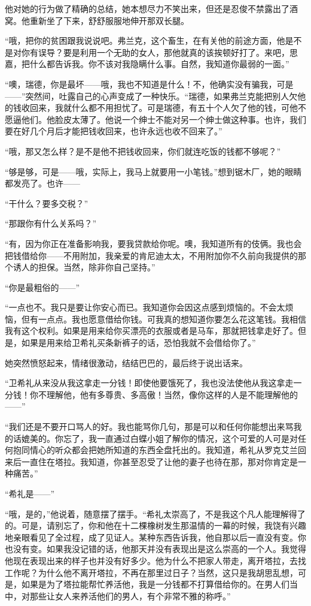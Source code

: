 \par 他对她的行为做了精确的总结，她本想尽力不笑出来，但还是忍俊不禁露出了酒窝。他重新坐了下来，舒舒服服地伸开那双长腿。
\par “哦，把你的贫困跟我说说吧。弗兰克，这个畜生，在有关他的前途方面，他是不是对你有误导？要是利用一个无助的女人，那他就真的该挨顿好打了。来吧，思嘉，把什么都告诉我。你不该对我隐瞒什么事。自然，我知道你最弱的一面。”
\par “噢，瑞德，你是最坏——哦，我也不知道是什么！不，他确实没有骗我，可是——”突然间，吐露自己的心声变成了一种快乐。“瑞德，如果弗兰克能把别人欠他的钱收回来，我就什么都不用担忧了。可是瑞德，有五十个人欠了他的钱，可他不愿逼他们。他脸皮太薄了。他说一个绅士不能对另一个绅士做这种事。也许，我们要在好几个月后才能把钱收回来，也许永远也收不回来了。”
\par “哦，那又怎么样？是不是他不把钱收回来，你们就连吃饭的钱都不够呢？”
\par “够是够，可是——哦，实际上，我马上就要用一小笔钱。”想到锯木厂，她的眼睛都发亮了。也许——
\par “干什么？要多交税？”
\par “那跟你有什么关系吗？”
\par “有，因为你正在准备影响我，要我贷款给你呢。噢，我知道所有的伎俩。我也会把钱借给你——不用附加，我亲爱的肯尼迪太太，不用附加你不久前向我提供的那个诱人的担保。当然，除非你自己坚持。”
\par “你是最粗俗的——”
\par “一点也不。我只是要让你安心而已。我知道你会因这点感到烦恼的。不会太烦恼，但有一点点。我也愿意借给你钱。可我真的想知道你要怎么花这笔钱。我相信我有这个权利。如果是用来给你买漂亮的衣服或者是马车，那就把钱拿走好了。但是，如果是用来给卫希礼买条新裤子的话，恐怕我就不会借给你了。”
\par 她突然愤怒起来，情绪很激动，结结巴巴的，最后终于说出话来。
\par “卫希礼从来没从我这拿走一分钱！即使他要饿死了，我也没法使他从我这拿走一分钱！你不理解他，他有多尊贵、多高傲！当然，像你这样的人是不能理解他的——”
\par “我们还是不要开口骂人的好。我也能骂你几句，那是可以和任何你能想出来骂我的话媲美的。你忘了，我一直通过白蝶小姐了解你的情况，这个可爱的人可是对任何抱同情心的听众都会把她所知道的东西全盘托出的。我知道，希礼从罗克艾兰回来后一直住在塔拉。我知道，你甚至忍受了让他的妻子也待在那，那对你肯定是一种痛苦。”
\par “希礼是——”
\par “哦，是的，”他说着，随意摆了摆手。“希礼太崇高了，不是我这个凡人能理解得了的。可是，请别忘了，你和他在十二棵橡树发生那温情的一幕的时候，我饶有兴趣地亲眼看见了全过程，成了见证人。某种东西告诉我，他自那以后一直没有变。你也没有变。如果我没记错的话，他那天并没有表现出是这么崇高的一个人。我觉得他现在表现出来的样子也并没有好多少。他为什么不把家人带走，离开塔拉，去找工作呢？为什么他不离开塔拉，不再在那里过日子？当然，这只是我胡思乱想，可是，如果是为了塔拉能帮忙养活他，我是一分钱都不打算借给你的。在男人们当中，对那些让女人来养活他们的男人，有个非常不雅的称呼。”
